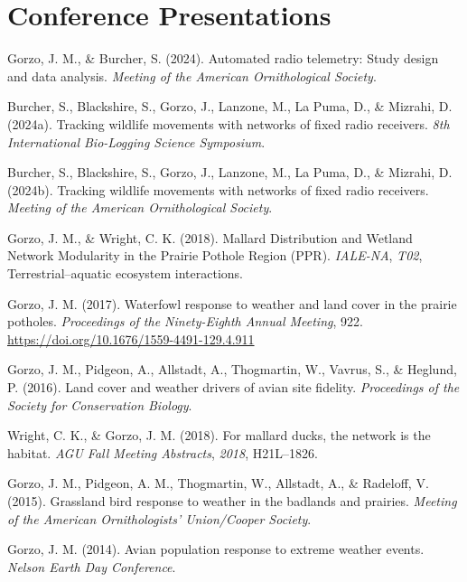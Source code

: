 \documentclass[11pt,a4paper,]{awesome-cv}
\newlength{\cslhangindent}
\newenvironment{CSLReferences}[2] %
 {\begin{list}{}{%
  \setlength{\itemindent}{0pt}
  \setlength{\leftmargin}{0pt}
  \setlength{\parsep}{0pt}
  \ifodd #1
   \setlength{\leftmargin}{\cslhangindent}
   \setlength{\itemindent}{-1\cslhangindent}
  \fi
  \setlength{\itemsep}{#2\baselineskip}}}
 {\end{list}}
\begin{document}
\section{Conference Presentations}\label{conference-presentations}

\label{refs-c9a32b88bbdb94f2a9a10d4107dff1d8}
\begin{CSLReferences}{1}{0}
Gorzo, J. M., \& Burcher, S. (2024). Automated radio telemetry: Study
design and data analysis. \emph{Meeting of the American Ornithological
Society}.

Burcher, S., Blackshire, S., Gorzo, J., Lanzone, M., La Puma, D., \&
Mizrahi, D. (2024a). Tracking wildlife movements with networks of fixed
radio receivers. \emph{8th International Bio-Logging Science Symposium}.

Burcher, S., Blackshire, S., Gorzo, J., Lanzone, M., La Puma, D., \&
Mizrahi, D. (2024b). Tracking wildlife movements with networks of fixed
radio receivers. \emph{Meeting of the American Ornithological Society}.

Gorzo, J. M., \& Wright, C. K. (2018). Mallard Distribution and Wetland
Network Modularity in the Prairie Pothole Region (PPR). \emph{IALE-NA},
\emph{T02}, Terrestrial--aquatic ecosystem interactions.

Gorzo, J. M. (2017). Waterfowl response to weather and land cover in the
prairie potholes. \emph{Proceedings of the Ninety-Eighth Annual
Meeting}, 922. \url{https://doi.org/10.1676/1559-4491-129.4.911}

Gorzo, J. M., Pidgeon, A., Allstadt, A., Thogmartin, W., Vavrus, S., \&
Heglund, P. (2016). Land cover and weather drivers of avian site
fidelity. \emph{Proceedings of the Society for Conservation Biology}.

Wright, C. K., \& Gorzo, J. M. (2018). For mallard ducks, the network is
the habitat. \emph{AGU Fall Meeting Abstracts}, \emph{2018}, H21L--1826.

Gorzo, J. M., Pidgeon, A. M., Thogmartin, W., Allstadt, A., \& Radeloff,
V. (2015). Grassland bird response to weather in the badlands and
prairies. \emph{Meeting of the American Ornithologists' Union/Cooper
Society}.

Gorzo, J. M. (2014). Avian population response to extreme weather
events. \emph{Nelson Earth Day Conference}.


\end{CSLReferences}
\end{document}
